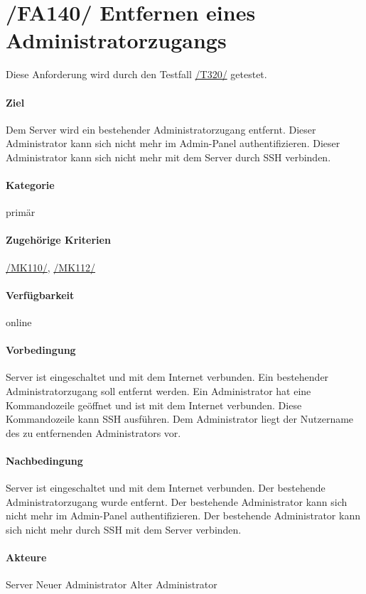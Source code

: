 \section[Entfernen eines Administratorzugangs]{/FA140/ Entfernen eines Administratorzugangs}
\label{/FA140/}
Diese Anforderung wird durch den Testfall \hyperref[/T320/]{/T320/} getestet.
\paragraph{Ziel}
Dem \Gls{Server} wird ein bestehender \Gls{Administrator}zugang entfernt.
Dieser Administrator kann sich nicht mehr im \Gls{Admin-Panel} authentifizieren.
Dieser Administrator kann sich nicht mehr mit dem \Gls{Server} durch \Gls{SSH} verbinden.
\paragraph{Kategorie}
primär
\paragraph{Zugehörige Kriterien}
\hyperref[/MK110/]{/MK110/}, \hyperref[/MK112/]{/MK112/}
\paragraph{Verfügbarkeit}
online
\paragraph{Vorbedingung}
\Gls{Server} ist eingeschaltet und mit dem Internet verbunden.
Ein bestehender \Gls{Administrator}zugang soll entfernt werden.
Ein \Gls{Administrator} hat eine \Gls{Kommandozeile} geöffnet und ist mit dem Internet verbunden.
Diese \Gls{Kommandozeile} kann \Gls{SSH} ausführen.
Dem \Gls{Administrator} liegt der Nutzername des zu entfernenden \Gls{Administrator}s vor.
\paragraph{Nachbedingung}
\Gls{Server} ist eingeschaltet und mit dem Internet verbunden.
Der bestehende \Gls{Administrator}zugang wurde entfernt.
Der bestehende \Gls{Administrator} kann sich nicht mehr im \Gls{Admin-Panel} authentifizieren.
Der bestehende \Gls{Administrator} kann sich nicht mehr durch \Gls{SSH} mit dem Server verbinden.
\paragraph{Akteure}
\Gls{Server}
Neuer \Gls{Administrator}
Alter \Gls{Administrator}
